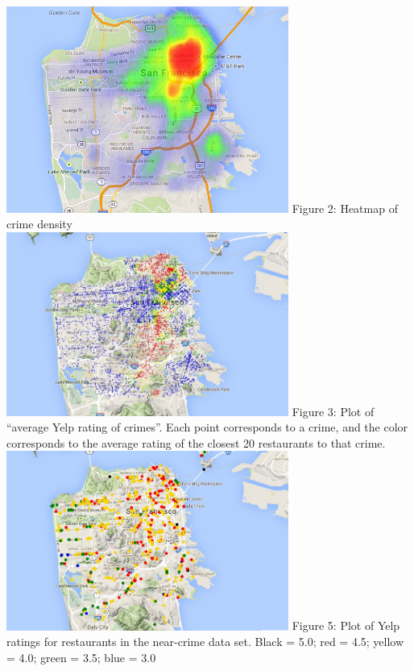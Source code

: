 \documentclass{article}
\begin{document}
\begin{center}
  \includegraphics[keepaspectratio=true, width=350px]{crime_density_heatmap.png}
  Figure 2: Heatmap of crime density \\[20pt]

  \includegraphics[keepaspectratio=true, width=350px]{all_yelp_ratings_plotted.jpg}
  Figure 3: Plot of ``average Yelp rating of crimes''. Each point
  corresponds to a crime, and the color corresponds to the average rating
  of the closest 20 restaurants to that crime. \\[20pt]

  \includegraphics[keepaspectratio=true, width=350px]{unique_yelp_rating_plot.jpg}
  Figure 5: Plot of Yelp ratings for restaurants in the near-crime data
  set. Black = 5.0; red = 4.5; yellow = 4.0; green = 3.5; blue = 3.0 \\[20pt]
\end{center}
\end{document}
